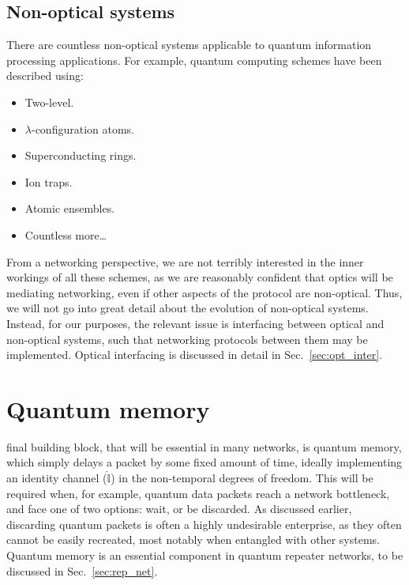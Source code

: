 \subsection{Non-optical systems}

There are countless non-optical systems applicable to quantum information processing applications. For example, quantum computing schemes have been described using:
\begin{itemize}
	\item Two-level.
	\item $\lambda$-configuration atoms.
	\item Superconducting rings.
	\item Ion traps.
	\item Atomic ensembles.
	\item Countless more\ldots
\end{itemize}

From a networking perspective, we are not terribly interested in the inner workings of all these schemes, as we are reasonably confident that optics will be mediating networking, even if other aspects of the protocol are non-optical. Thus, we will not go into great detail about the evolution of non-optical systems. Instead, for our purposes, the relevant issue is interfacing between optical and non-optical systems, such that networking protocols between them may be implemented. Optical interfacing is discussed in detail in Sec.~\ref{sec:opt_inter}.

%
%

\section{Quantum memory} \label{sec:memory} 


 final building block, that will be essential in many networks, is quantum memory, which simply delays a packet by some fixed amount of time, ideally implementing an identity channel ($\hat{\mathbb{I}}$) in the non-temporal degrees of freedom. This will be required when, for example, quantum data packets reach a network bottleneck, and face one of two options: wait, or be discarded. As discussed earlier, discarding quantum packets is often a highly undesirable enterprise, as they often cannot be easily recreated, most notably when entangled with other systems. Quantum memory is an essential component in quantum repeater networks, to be discussed in Sec.~\ref{sec:rep_net}.

